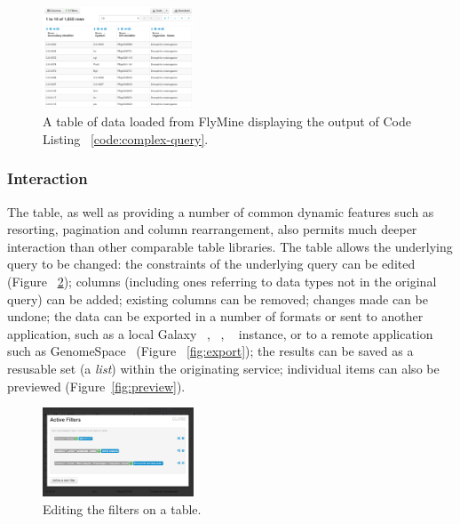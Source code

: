 \documentclass[10pt,a4paper,twocolumn]{article}
\begin{document}
\begin{figure}
\centering
\includegraphics[width=0.4\textwidth]{imtable-complex.png}
\caption{
    \label{fig:complex}
    A table of data loaded from FlyMine displaying the output of Code Listing
    ~\ref{code:complex-query}.
}
\end{figure}

\subsubsection*{Interaction}

The table, as well as providing a number of common dynamic features such as
resorting, pagination and column rearrangement, also permits much deeper
interaction than other comparable table libraries. The table allows the
underlying query to be changed: the constraints of the underlying query can be
edited (Figure ~\ref{fig:edit-filters}); columns (including ones referring to
data types not in the original query) can be added; existing columns can be
removed; changes made can be undone; the data can be exported in a number of
formats or sent to another application, such as a local Galaxy
~\cite{goecks2010galaxy}, ~\cite{blankenberg2010galaxy},
~\cite{giardine2005galaxy} instance, or to a remote application such as
GenomeSpace~\cite{genomespace} (Figure ~\ref{fig:export}); the results can be
saved as a resusable set (a \emph{list}) within the originating service;
individual items can also be previewed (Figure~\ref{fig:preview}).

\begin{figure}[htb]
\centering
\includegraphics[width=0.4\textwidth]{table-edit-filters.png}
\caption{\label{fig:edit-filters} Editing the filters on a table.}
\end{figure}
\end{document}
